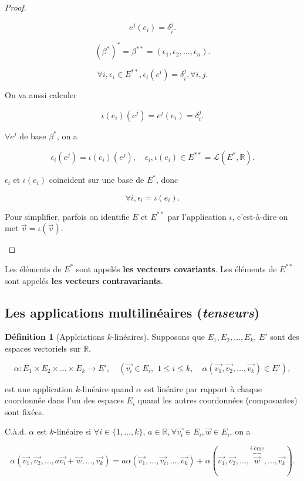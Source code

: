 \documentclass[french]{article}
\theoremstyle{definition}
\newtheorem{protodefinition}{Définition}[section]
\newenvironment{definition}
    {\colorlet{shadecolor}{green!5}\begin{shaded}\begin{protodefinition}}
    {\end{protodefinition}\end{shaded}}
\begin{document}
\begin{proof}
\begin{enumerate}
    \[
    e ^{j}(e_i) = \delta_i ^{j}.
    \]

    \[
    (\beta ^{*}) ^{*} = \beta ^{**} = (\epsilon_1, \epsilon_2, \dots, \epsilon_n).
    \]

    \begin{equation} \label{base1}
      \forall i, \epsilon_i \in E ^{**}, \epsilon_i(e ^{i}) = \delta_i ^{j}, \forall i, j.
    \end{equation}

    On va aussi calculer

    \begin{equation} \label{base2}
      \iota(e_i)(e ^{j}) = e ^{j}(e_i) = \delta_i ^{j}.
    \end{equation}

    $\forall e ^{j}$ de base $\beta ^{*}$, on a

    \[
    \epsilon_i(e ^{j}) = \iota(e_i)(e ^{j}), \quad \epsilon_i, \iota(e_i) \in E ^{**} = \mathscr{L}(E ^{*}, \mathbb{R}).
    \]

    $\epsilon _i$ et $\iota(e_i)$ coincident sur une base de $E ^{*}$, donc

    \[
    \forall i, \epsilon_i = \iota(e_i).
    \]

    Pour simplifier, parfois on identifie $E$ et $E ^{**}$ par l'application $\iota$, c'est-à-dire on met $\vec{ v } = \iota(\vec{ v })$.
  \end{enumerate}
\end{proof}

Les éléments de $E ^{*}$ sont appelés \textbf{les vecteurs covariants}. Les éléments de $E ^{**}$ sont appelés \textbf{les vecteurs contravariants}.

\subsection{Les applications multilinéaires ({\it tenseurs})}

\begin{definition}[Applciations $k$-lin\'eaires]
Supposons que $E_1, E_2, \dots, E_k$, $E'$ sont des espaces vectoriels sur $\mathbb{R}$.

\[
\alpha : E_1 \times E_2 \times \dots \times E_k \longrightarrow E', \quad (\vec{ v_i } \in E_i , \,\, 1 \leq i \leq k,\quad  \alpha(\vec{ v_1 }, \vec{ v_2 }, \dots, \vec{ v_k }) \in E'),
\]

est une application $k$-linéaire quand $\alpha$ est linéaire par rapport à chaque coordonnée dans l'un des espaces $E_i$ quand les autres coordonnées (composantes) sont fixées.

C.\`a.d.  $\alpha$ est $k$-linéaire si $\forall i \in \{ 1, \dots, k \}$, $a \in \mathbb{R}, \forall \vec{ v_i } \in E_i, \vec{ w } \in E_i $, on a

\[
\alpha(\vec{ v_1 }, \vec{ v_2 }, \dots, a \vec{ v_i }+ \vec{ w }, \dots, \vec{ v_k }) = a \alpha(\vec{ v_1 }, \dots, \vec{ v_i }, \dots, \vec{ v_k })+ \alpha(\vec{ v_1 }, \vec{ v_2 }, \dots, \overbrace{\vec{ w } }^{i\text{-ème}}, \dots, \vec{ v_k }).
\]

\end{definition}
\end{document}
